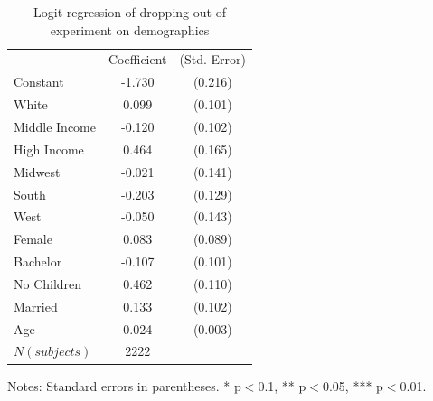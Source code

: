 \documentclass[12pt]{article}
\newcommand{\sym}[1]{\rlap{$^{#1}$}}
\begin{document}
\begin{table}[H]
        \centering
        \caption{Logit regression of dropping out of experiment on demographics}
        \label{tab:Incomplete}
     \begin{tabular}{l*{1}{cc}}
            & Coefficient & (Std. Error)    \\
Constant    &      -1.730\sym{***}&     (0.216)\\
White       &       0.099         &     (0.101)\\
Middle Income&      -0.120         &     (0.102)\\
High Income &       0.464\sym{***}&     (0.165)\\
Midwest     &      -0.021         &     (0.141)\\
South       &      -0.203         &     (0.129)\\
West        &      -0.050         &     (0.143)\\
Female      &       0.083         &     (0.089)\\
Bachelor    &      -0.107         &     (0.101)\\
No Children &       0.462\sym{***}&     (0.110)\\
Married     &       0.133         &     (0.102)\\
Age         &       0.024\sym{***}&     (0.003)\\
\(N (subjects)\)       &        2222         &            \\
\end{tabular}


\begin{tablenotes}
            \footnotesize
            \item Notes: Standard errors in parentheses. * p$<$0.1, ** p$<$0.05, *** p$<$0.01.             
        \end{tablenotes}
\end{table}







\clearpage

\end{document}
